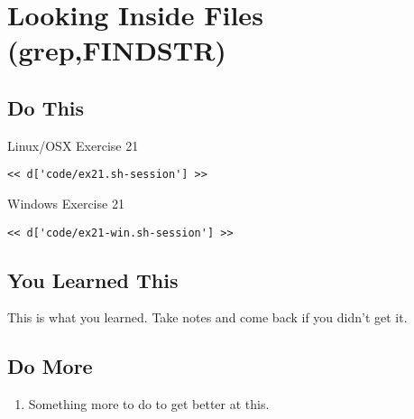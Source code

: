 \chapter{Looking Inside Files (grep,FINDSTR)}

\section{Do This}

\begin{code}{Linux/OSX Exercise 21}
\begin{Verbatim}
<< d['code/ex21.sh-session'] >>
\end{Verbatim}
\end{code}

\begin{code}{Windows Exercise 21}
\begin{Verbatim}
<< d['code/ex21-win.sh-session'] >>
\end{Verbatim}
\end{code}

\section{You Learned This}

This is what you learned.  Take notes and come back if you didn't get it.

\section{Do More}

\begin{enumerate}
\item Something more to do to get better at this.
\end{enumerate}

